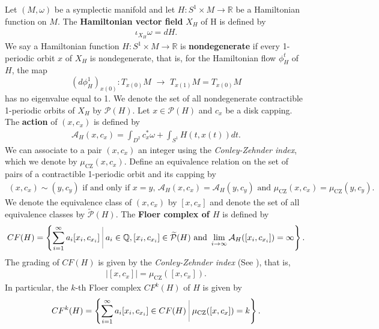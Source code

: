 \documentclass[12pt]{amsart}
\def\bigmid{\ \rule[-3.5mm]{0.1mm}{9mm}\ }
\theoremstyle{definition}
\newcommand{\RR}{{\mathbb R}}
\newcommand{\QQ}{{\mathbb Q}}
\newcommand{\lr}{{\,\,\longrightarrow\,\,}}
\begin{document}
\par Let $(M, \omega)$ be a symplectic manifold and let $H : S^1 \times M \to \RR$ be a Hamiltonian function on $M$. The \textbf{Hamiltonian vector field} $X_H$ of H is defined by 
\begin{align*}
    \iota_{X_H} \omega = dH.
\end{align*}
We say a Hamiltonian function $H :S^1 \times M \to \RR$ is \textbf{nondegenerate} if every 1-periodic orbit $x$ of $X_H$ is nondegenerate, that is, for the Hamiltonian flow $\phi_H^t$ of $H$, the map $$(d \phi^1_H)_{x(0)} : T_{x(0)}M \lr T_{x(1)}M = T_{x(0)}M$$ has no eigenvalue equal to 1. We denote the set of all nondegenerate contractible 1-periodic orbits of $X_H$ by $\mathcal{P}(H)$. Let $x \in \mathcal{P}(H)$ and $c_x$ be a disk capping. The \textbf{action} of $(x, c_x)$ is defined by
\begin{align}\label{act}
    \mathcal{A}_H(x, c_x) = \int_{D^2} c_x^* \omega + \int_{S^1} H(t, x(t))dt.
\end{align}
We can associate to a pair $(x, c_x)$ an integer using the \textit{Conley-Zehnder index}, which we denote by $\mu_{\text{CZ}}(x,c_x)$. Define an equivalence relation on the set of pairs of a contractible 1-periodic orbit and its capping by
\begin{align*}
    (x, c_x) \sim (y, c_y) \,\,\text{if and only if}\,\, x = y, \,\mathcal{A}_H(x, c_x) = \mathcal{A}_H(y, c_y) \,\,\text{and}\,\, \mu_{\text{CZ}}(x,c_x) = \mu_{\text{CZ}}(y,c_y).
\end{align*}
We denote the equivalence class of $(x, c_x)$ by $[x,c_x]$ and denote the set of all equivalence classes by $\widetilde{\mathcal{P}}(H)$. The \textbf{Floer complex of $H$} is defined by
\begin{align*}
    CF(H) = \left\{\sum_{i=1}^{\infty}a_i [x_i, c_{x_i}] \bigmid a_i \in \QQ,  [x_i, c_{x_i}] \in  \widetilde{\mathcal{P}}(H)\,\,\text{and}\,\, \lim_{i \to \infty} \mathcal{A}_H([x_i, c_{x_i}]) = \infty \right\}.
  \end{align*}
The grading of $CF(H)$ is given by the \textit{Conley-Zehnder index} (See \cite{sz}), that is,
\begin{align*}
    | [x, c_x]| = \mu_{\text{CZ}}([x, c_x]).
\end{align*}
In particular, the $k$-th Floer complex $CF^k(H)$ of $H$ is given by
\begin{align*}
   CF^k(H)= \left\{\sum_{i=1}^{\infty}a_i [x_i, c_{x_i}] \in CF(H) \bigmid \mu_{\text{CZ}}([x, c_x])=k  \right\}.
\end{align*}
\end{document}
